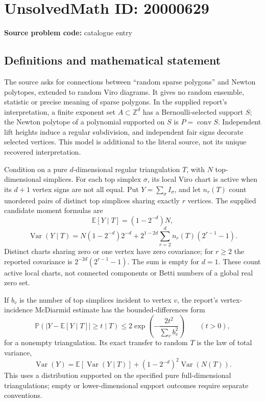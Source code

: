 \documentclass[11pt]{article}
\newcommand{\Z}{\mathbb{Z}}
\begin{document}
\section*{UnsolvedMath ID: 20000629}
\textbf{Source problem code:} catalogue entry
\subsection{Definitions and mathematical statement}
The source asks for connections between ``random sparse polygons'' and Newton polytopes, extended to random Viro diagrams. It gives no random ensemble, statistic or precise meaning of sparse polygons. In the supplied report's interpretation, a finite exponent set \(A\subset\Z^d\) has a Bernoulli-selected support \(S\); the Newton polytope of a polynomial supported on \(S\) is \(P=\operatorname{conv}S\). Independent lift heights induce a regular subdivision, and independent fair signs decorate selected vertices. This model is additional to the literal source, not its unique recovered interpretation.

Condition on a pure \(d\)-dimensional regular triangulation \(T\), with \(N\) top-dimensional simplices. For each top simplex \(\sigma\), its local Viro chart is active when its \(d+1\) vertex signs are not all equal. Put \(Y=\sum_\sigma I_\sigma\), and let \(n_r(T)\) count unordered pairs of distinct top simplices sharing exactly \(r\) vertices. The supplied candidate moment formulas are
\[
 \mathbb E[Y\mid T]=(1-2^{-d})N,
\]
\[
 \operatorname{Var}(Y\mid T)=N(1-2^{-d})2^{-d}
 +2^{1-2d}\sum_{r=2}^dn_r(T)(2^{r-1}-1).
\]
Distinct charts sharing zero or one vertex have zero covariance; for \(r\ge2\) the reported covariance is \(2^{-2d}(2^{r-1}-1)\). The sum is empty for \(d=1\). These count active local charts, not connected components or Betti numbers of a global real zero set.

If \(b_v\) is the number of top simplices incident to vertex \(v\), the report's vertex-incidence McDiarmid estimate has the bounded-differences form
\[
 \mathbb P(|Y-\mathbb E[Y\mid T]|\ge t\mid T)
 \le2\exp\left(-\frac{2t^2}{\sum_vb_v^2}\right)\qquad(t>0),
\]
for a nonempty triangulation. Its exact transfer to random \(T\) is the law of total variance,
\[
 \operatorname{Var}(Y)=\mathbb E[\operatorname{Var}(Y\mid T)]
 +(1-2^{-d})^2\operatorname{Var}(N(T)).
\]
This uses a distribution supported on the specified pure full-dimensional triangulations; empty or lower-dimensional support outcomes require separate conventions.
\end{document}
